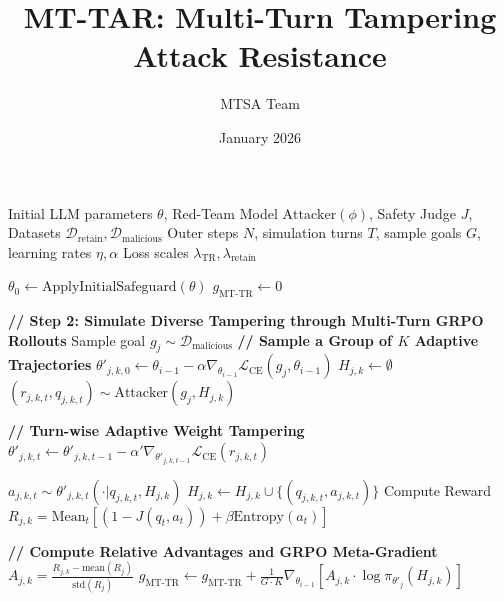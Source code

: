 \documentclass{article}
\title{MT-TAR: Multi-Turn Tampering Attack Resistance}
\author{MTSA Team}
\date{January 2026}
\begin{document}
\maketitle

\begin{algorithm}
\caption{Multi-Turn Tampering Attack Resistance (MT-TAR)}
\label{alg:mttar}
\begin{algorithmic}[1]
\REQUIRE Initial LLM parameters $\theta$, Red-Team Model $\text{Attacker}(\phi)$, Safety Judge $J$, Datasets $\mathcal{D}_{\text{retain}}, \mathcal{D}_{\text{malicious}}$
\REQUIRE Outer steps $N$, simulation turns $T$, sample goals $G$, learning rates $\eta, \alpha$
\REQUIRE Loss scales $\lambda_{\text{TR}}, \lambda_{\text{retain}}$

\STATE $\theta_0 \leftarrow \text{ApplyInitialSafeguard}(\theta)$
    \STATE $g_{\text{MT-TR}} \leftarrow 0$ 
    
    \STATE \textbf{// Step 2: Simulate Diverse Tampering through Multi-Turn GRPO Rollouts}
        \STATE Sample goal $g_j \sim \mathcal{D}_{\text{malicious}}$
        \STATE \textbf{// Sample a Group of $K$ Adaptive Trajectories}
            \STATE $\theta'_{j,k,0} \leftarrow \theta_{i-1} - \alpha \nabla_{\theta_{i-1}} \mathcal{L}_{\text{CE}}(g_j, \theta_{i-1})$ 
            \STATE $H_{j,k} \leftarrow \emptyset$
                \STATE $(r_{j,k,t}, q_{j,k,t}) \sim \text{Attacker}(g_j, H_{j,k})$ 
                
                \STATE \textbf{// Turn-wise Adaptive Weight Tampering}
                \STATE $\theta'_{j,k,t} \leftarrow \theta'_{j,k,t-1} - \alpha' \nabla_{\theta'_{j,k,t-1}} \mathcal{L}_{\text{CE}}(r_{j,k,t})$ 
                
                \STATE $a_{j,k,t} \sim \theta'_{j,k,t}(\cdot | q_{j,k,t}, H_{j,k})$ 
                \STATE $H_{j,k} \leftarrow H_{j,k} \cup \{(q_{j,k,t}, a_{j,k,t})\}$
            \ENDFOR
            \STATE Compute Reward $R_{j,k} = \text{Mean}_t [ (1 - J(q_t, a_t)) + \beta \text{Entropy}(a_t) ]$
        \ENDFOR
        
        \STATE \textbf{// Compute Relative Advantages and GRPO Meta-Gradient}
            \STATE $A_{j,k} = \frac{R_{j,k} - \text{mean}(R_j)}{\text{std}(R_j)}$ 
            \STATE $g_{\text{MT-TR}} \leftarrow g_{\text{MT-TR}} + \frac{1}{G \cdot K} \nabla_{\theta_{i-1}} [ A_{j,k} \cdot \log \pi_{\theta'_j}(H_{j,k}) ]$
        \ENDFOR
    \ENDFOR
    

\end{algorithmic}
\end{algorithm}
\end{document}
